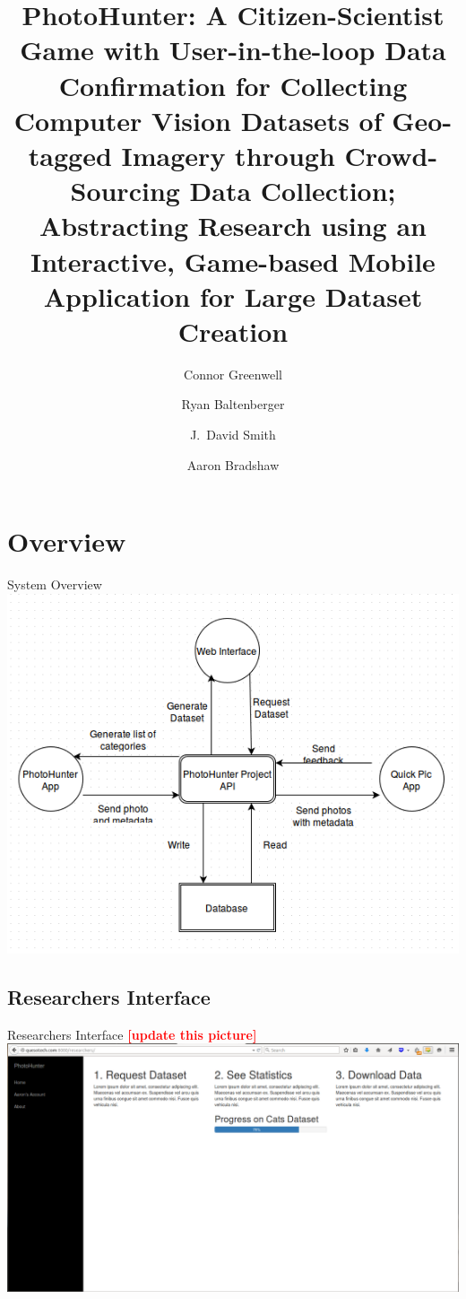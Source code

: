 \documentclass[aspectratio=169]{beamer}
\title[PhotoHunter]{PhotoHunter: A Citizen-Scientist Game with User-in-the-loop
  Data Confirmation for Collecting Computer Vision Datasets of
  Geo-tagged Imagery through Crowd-Sourcing Data Collection;
  Abstracting Research using an Interactive, Game-based Mobile
  Application for Large Dataset Creation}
\author[]{Connor Greenwell \and Ryan Baltenberger
  \and J.\ David Smith \and Aaron Bradshaw}
\institute{QuesoTech.com}
\newcommand{\todo}[1]{\textcolor{red}{\textbf{[#1]}}}
\begin{document}
\maketitle

\section{Overview}

\begin{frame}{System Overview}
  \centering
  \includegraphics[width=\textwidth,height=\textheight,keepaspectratio]{ss_flowchart}
\end{frame}

\subsection{Researchers Interface}

\begin{frame}{Researchers Interface}
  \centering
	\todo{update this picture}
  \includegraphics[width=\textwidth,height=\textheight,keepaspectratio]{researchers}
\end{frame}
\end{document}
